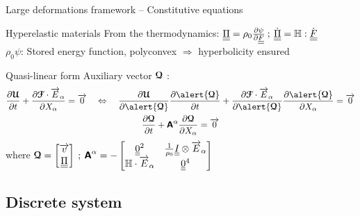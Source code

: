 \begin{frame}{Large deformations framework -- Constitutive equations}
  \begin{footnotesize}
    \begin{block}{Hyperelastic materials}
      From the thermodynamics: ${\underline{\underline{\Pi}}}=\rho_0\frac{\partial \psi}{\partial {\underline{\underline{F}}}}\: ; \: \dot{{\underline{\underline{\Pi}}}}=\mathbb{H} : \dot{{\underline{\underline{F}}}}$ \\
      $\rho_0\psi$: Stored energy function, polyconvex $\Rightarrow$ hyperbolicity ensured \cite{Kluth}
    \end{block}
    \begin{block}{Quasi-linear form}
      Auxiliary vector ${\boldsymbol{\mathcal{Q}}}$ \cite{Trangenstein91}: %
      \begin{gather*}
        \drond{\Ucb}{t} + \drond{\Fcb\cdot\vect{E}_\alpha}{X_\alpha} = \vect{0} \quad \Leftrightarrow \quad \drond{\Ucb}{\alert{\Qcb}}\drond{\alert{\Qcb}}{t} + \drond{\Fcb\cdot\vect{E}_\alpha}{\alert{\Qcb}}\drond{\alert{\Qcb}}{X_\alpha}=\vect{0} \\
        \drond{\Qcb}{t} + \Absf^\alpha \drond{\Qcb}{X_\alpha} = \vect{0}
      \end{gather*}
      where ${\boldsymbol{\mathcal{Q}}}=\left[\begin{matrix}{\overrightarrow{v}}\\{\underline{\underline{\Pi}}}\end{matrix}\right] \: ; \: \boldsymbol{\mathsf{A}}^\alpha = -\left[\begin{matrix}{\underline{\underline{0}}}^2 & \frac{1}{\rho_0}{\underline{\underline{I}}}\otimes{\overrightarrow{E}}_\alpha \\ \mathbb{H}\cdot{\overrightarrow{E}}_\alpha & {\underline{\underline{0}}}^4\end{matrix}\right]$
    \end{block}
  \end{footnotesize}
\end{frame}



\subsection{Discrete system}

